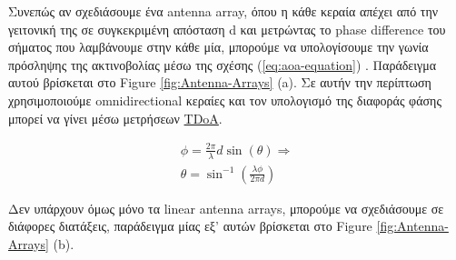 Συνεπώς αν σχεδιάσουμε ένα antenna array, όπου η κάθε κεραία απέχει από την γειτονική της σε συγκεκριμένη απόσταση d και μετρώντας 
το phase difference του σήματος που λαμβάνουμε στην κάθε μία, μπορούμε να υπολογίσουμε την γωνία πρόσληψης της ακτινοβολίας μέσω της 
σχέσης (\ref{eq:aoa-equation}) \cite{wsn-Localization-techniques} \cite{youtube-phase-difference-equation}. Παράδειγμα αυτού βρίσκεται στο Figure \ref{fig:Antenna-Arrays} (a).
Σε αυτήν την περίπτωση χρησιμοποιούμε omnidirectional κεραίες και τον υπολογισμό της διαφοράς φάσης μπορεί να γίνει
μέσω μετρήσεων \hyperref[abbr:TDoA]{TDoA}.

\begin{gather} 
	\phi = \frac{2\pi}{\lambda}d\sin(\theta) \Rightarrow \nonumber \\[2pt]
	\theta = \sin^{-1}\left(\frac{\lambda \phi}{2\pi d}\right) \label{eq:aoa-equation}
\end{gather}

Δεν υπάρχουν όμως μόνο τα linear antenna arrays, μπορούμε να σχεδιάσουμε σε διάφορες διατάξεις, 
παράδειγμα μίας εξ' αυτών βρίσκεται στο Figure \ref{fig:Antenna-Arrays} (b).

